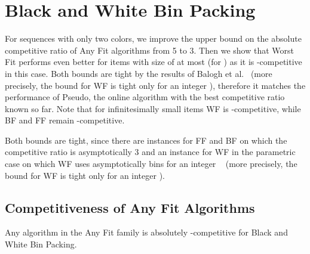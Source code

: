 \documentclass[11pt,a4paper]{article}
\begin{document}
\section{Black and White Bin Packing}\label{sec:BWBP}

For sequences with only two colors,
we improve the upper bound on the absolute competitive ratio of Any Fit algorithms from 5 to 3.
Then we show that Worst Fit performs even better
for items with size of at most  (for )
as it is -competitive in this case.
Both bounds are tight by the results of Balogh et al.~\cite{balogh14}
(more precisely, the bound for WF is tight only for an integer ),
therefore it matches the performance of Pseudo, the online algorithm with the best competitive
ratio known so far. Note that for infinitesimally small items WF is -competitive,
while BF and FF remain -competitive.

Both bounds are tight, since there are instances for FF and
BF on which the competitive ratio is asymptotically 3 and an instance
for WF in the parametric case on which WF uses asymptotically  bins for an integer ~\cite{balogh14}
(more precisely, the bound for WF is tight only for an integer ).

\subsection{Competitiveness of Any Fit Algorithms} \label{sec:AF-BWBP}
\begin{theorem}
\label{thm:AFcomp}
Any algorithm in the Any Fit family is absolutely -competitive for
Black and White Bin Packing.
\end{theorem}
\end{document}
